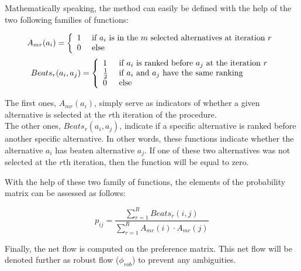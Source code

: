 Mathematically speaking, the method can easily be defined with the help of the two following families of functions:

\begin{equation}
  \label{eqn:ar}
  \begin{split}
      A_{mr}(a_{i}) = \left\{
    \begin{array}{l l}
        1 & \ \text{if $a_{i}$ is in the $m$ selected alternatives at iteration $r$}\\
        0 & \ \text{else}\\
    \end{array} \right .
    \end{split}
\end{equation}
\begin{equation}
  \label{eqn:beats_r}
  Beats_{r}( a_{i}, a_{j}) = \left\{
    \begin{array}{l l}
      1 &           \ \text{if $a_{i}$ is ranked before $a_{j}$ at the iteration $r$}\\
      \frac{1}{2} & \ \text{if $a_{i}$ and $a_{j}$ have the same ranking}\\
      0 &           \ \text{else}\\
    \end{array} \right .
\end{equation}

The first ones, $A_{mr}(a_{i})$, simply serve as indicators of whether a given alternative is selected at the $r$th iteration of the procedure. \\
The other ones, $Beats_r(a_{i}, a_{j})$, indicate if a specific alternative is ranked before another specific alternative.
In other words, these functions indicate whether the alternative $a_i$ has beaten alternative $a_{j}$.
If one of these two alternatives was not selected at the $r$th iteration, then the function will be equal to zero.

With the help of these two family of functions, the elements of the probability matrix can be assessed as follows:

\begin{equation}
    \label{eqn:pij}
    p_{ij} = \frac{\sum\limits_{r=1}^R Beats_r(i,j)}{\sum\limits_{r=1}^R A_{mr}(i)\cdot A_{mr}(j)}
\end{equation}

Finally, the net flow is computed on the preference matrix. This net flow will be denoted further as robust flow ($\phi_{rob}$) to prevent any ambiguities.

